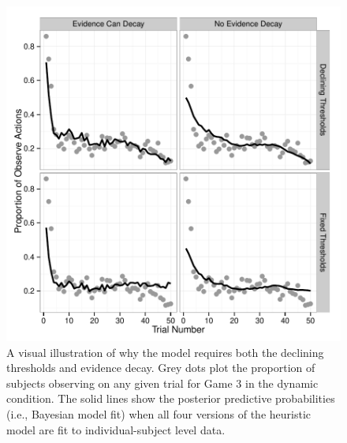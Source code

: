 \documentclass[authoryear]{elsarticle}
\begin{document}
\begin{figure}[p]
\begin{center}
\includegraphics[scale=.5]{modelPredictions2.pdf}
\caption{A visual illustration of why the model requires both the declining thresholds and evidence decay. Grey dots plot the proportion of subjects observing on any given trial for Game 3 in the dynamic condition. The solid lines show the posterior predictive probabilities (i.e., Bayesian model fit) when all four versions of the heuristic model are fit to individual-subject level data.}
\label{fig:modelfits2}
\end{center}
\end{figure}
\end{document}
